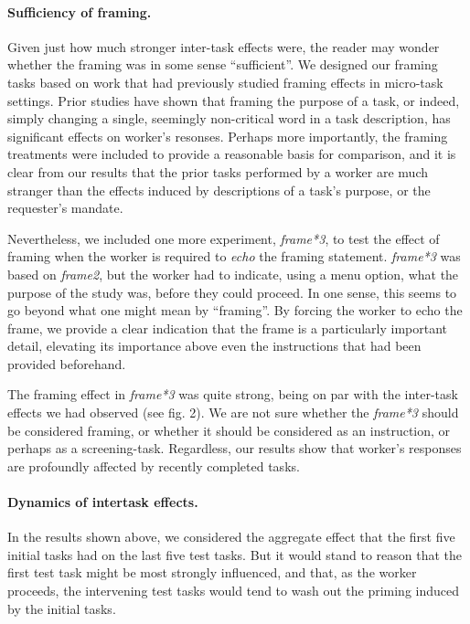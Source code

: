 \documentclass[12pt]{article}
\begin{document}
\paragraph{Sufficiency of framing.} Given just how much stronger
inter-task effects were, the reader may wonder whether the framing was 
in some sense ``sufficient''.  
We designed our framing tasks based on
work that had previously studied framing effects in micro-task settings.  
Prior studies have shown that framing the purpose of a task, or indeed, 
simply changing a single, seemingly non-critical word in a task description, 
has significant effects on worker's resonses.  Perhaps more importantly, the 
framing treatments were included to provide a reasonable basis for comparison,
and it is clear from our results that the prior tasks performed by a 
worker are much stranger than the effects induced by descriptions of a task's
purpose, or the requester's mandate.

Nevertheless, we included one more experiment, \textit{frame*3}, to test the 
effect of framing when the worker is required to \textit{echo} the framing 
statement.  \textit{frame*3} was based on \textit{frame2}, but the worker
had to indicate, using a menu option, what the purpose of the study was,
before they could proceed.  In one sense, this seems to go beyond what one
might mean by ``framing''.  By forcing the worker to echo the frame, we provide
a clear indication that the frame is a particularly important detail, 
elevating its importance above even the instructions that had been provided
beforehand.

The framing effect in \textit{frame*3} was quite strong, being on par with the
inter-task effects we had observed (see fig. 2).  We are not sure whether
the \textit{frame*3} should be considered framing,
or whether it should be considered as an instruction, or perhaps as a 
screening-task.  Regardless, our results show that worker's responses are 
profoundly affected by recently completed tasks. 


\paragraph{Dynamics of intertask effects.} 
In the results shown above, we considered the aggregate effect that the
first five initial tasks had on the last five test tasks.  But it would stand
to reason that the first test task might be
most strongly influenced, and that, as the worker proceeds, the intervening 
test tasks would tend to wash out the priming induced by the initial tasks.
\end{document}
